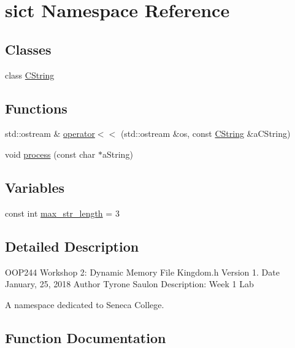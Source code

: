 \hypertarget{namespacesict}{}\section{sict Namespace Reference}
\label{namespacesict}
\subsection*{Classes}
\begin{DoxyCompactItemize}
\item 
class \mbox{\hyperlink{classsict_1_1CString}{C\+String}}
\end{DoxyCompactItemize}
\subsection*{Functions}
\begin{DoxyCompactItemize}
\item 
std\+::ostream \& \mbox{\hyperlink{namespacesict_a786297f321653531020c40f3798a6bcf}{operator$<$$<$}} (std\+::ostream \&os, const \mbox{\hyperlink{classsict_1_1CString}{C\+String}} \&a\+C\+String)
\item 
void \mbox{\hyperlink{namespacesict_acc63f5191bf3d6b1377757e4aadf289a}{process}} (const char $\ast$a\+String)
\end{DoxyCompactItemize}
\subsection*{Variables}
\begin{DoxyCompactItemize}
\item 
const int \mbox{\hyperlink{namespacesict_a42e52c18360f7ab5f80c8b39b7bf8b11}{max\+\_\+str\+\_\+length}} = 3
\end{DoxyCompactItemize}


\subsection{Detailed Description}


 O\+O\+P244 Workshop 2\+: Dynamic Memory File Kingdom.\+h Version 1. Date January, 25, 2018 Author Tyrone Saulon Description\+: Week 1 Lab

A namespace dedicated to Seneca College. 

\subsection{Function Documentation}
\mbox{\label{namespacesict_a786297f321653531020c40f3798a6bcf}} 
